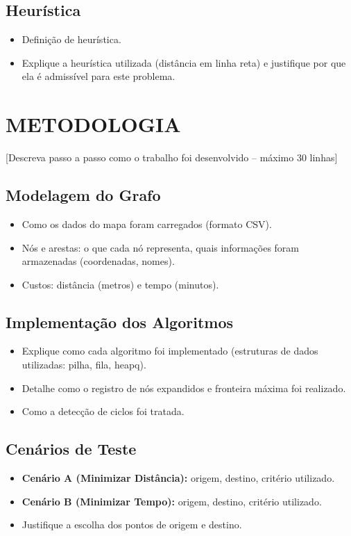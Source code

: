 \documentclass[12pt,a4paper]{article}
\begin{document}
\subsection{Heurística}
\begin{itemize}
    \item Definição de heurística.
    \item Explique a heurística utilizada (distância em linha reta) e justifique por que ela é admissível para este problema.
\end{itemize}

\section{METODOLOGIA}

[Descreva passo a passo como o trabalho foi desenvolvido – máximo 30 linhas]

\subsection{Modelagem do Grafo}
\begin{itemize}
    \item Como os dados do mapa foram carregados (formato CSV).
    \item Nós e arestas: o que cada nó representa, quais informações foram armazenadas (coordenadas, nomes).
    \item Custos: distância (metros) e tempo (minutos).
\end{itemize}

\subsection{Implementação dos Algoritmos}
\begin{itemize}
    \item Explique como cada algoritmo foi implementado (estruturas de dados utilizadas: pilha, fila, heapq).
    \item Detalhe como o registro de nós expandidos e fronteira máxima foi realizado.
    \item Como a detecção de ciclos foi tratada.
\end{itemize}

\subsection{Cenários de Teste}
\begin{itemize}
    \item \textbf{Cenário A (Minimizar Distância):} origem, destino, critério utilizado.
    \item \textbf{Cenário B (Minimizar Tempo):} origem, destino, critério utilizado.
    \item Justifique a escolha dos pontos de origem e destino.
\end{itemize}
\end{document}
